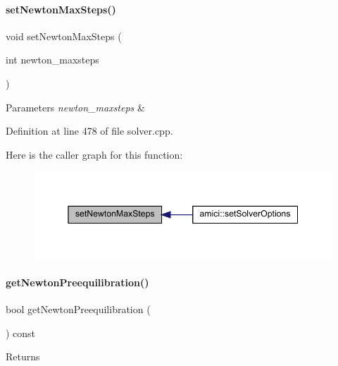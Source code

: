 \paragraph{\texorpdfstring{set\+Newton\+Max\+Steps()}{setNewtonMaxSteps()}}
{\footnotesize\ttfamily void set\+Newton\+Max\+Steps (\begin{DoxyParamCaption}\item[{int}]{newton\+\_\+maxsteps }\end{DoxyParamCaption})}


\begin{DoxyParams}{Parameters}
{\em newton\+\_\+maxsteps} & \\
\hline
\end{DoxyParams}


Definition at line 478 of file solver.\+cpp.

Here is the caller graph for this function\+:
\nopagebreak
\begin{figure}[H]
\begin{center}
\leavevmode
\includegraphics[width=345pt]{classamici_1_1_solver_abf2e868e186c724c8ab939ba261ef314_icgraph}
\end{center}
\end{figure}
\mbox{\label{classamici_1_1_solver_a75aabe2e004edaba96db48b0abd3fc6f}} 
\paragraph{\texorpdfstring{get\+Newton\+Preequilibration()}{getNewtonPreequilibration()}}
{\footnotesize\ttfamily bool get\+Newton\+Preequilibration (\begin{DoxyParamCaption}{ }\end{DoxyParamCaption}) const}

\begin{DoxyReturn}{Returns}

\end{DoxyReturn}


